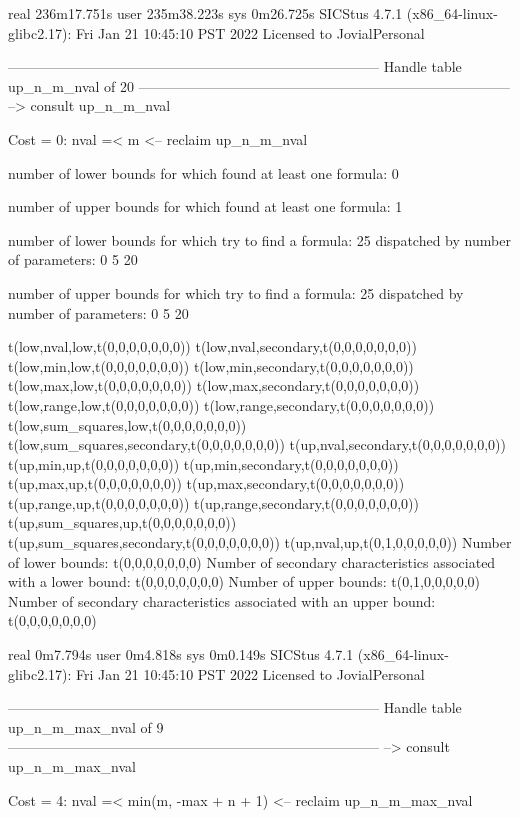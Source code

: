 real	236m17.751s
user	235m38.223s
sys	0m26.725s
SICStus 4.7.1 (x86_64-linux-glibc2.17): Fri Jan 21 10:45:10 PST 2022
Licensed to JovialPersonal


--------------------------------------------------------------------------------
Handle table up_n_m_nval of 20
--------------------------------------------------------------------------------
--> consult up_n_m_nval

Cost =  0:  nval =< m
<-- reclaim up_n_m_nval

number of lower bounds for which found at least one formula: 0

number of upper bounds for which found at least one formula: 1

number of lower bounds for which try to find a formula: 25
dispatched by number of parameters: 0  5  20

number of upper bounds for which try to find a formula: 25
dispatched by number of parameters: 0  5  20

t(low,nval,low,t(0,0,0,0,0,0,0))
t(low,nval,secondary,t(0,0,0,0,0,0,0))
t(low,min,low,t(0,0,0,0,0,0,0))
t(low,min,secondary,t(0,0,0,0,0,0,0))
t(low,max,low,t(0,0,0,0,0,0,0))
t(low,max,secondary,t(0,0,0,0,0,0,0))
t(low,range,low,t(0,0,0,0,0,0,0))
t(low,range,secondary,t(0,0,0,0,0,0,0))
t(low,sum_squares,low,t(0,0,0,0,0,0,0))
t(low,sum_squares,secondary,t(0,0,0,0,0,0,0))
t(up,nval,secondary,t(0,0,0,0,0,0,0))
t(up,min,up,t(0,0,0,0,0,0,0))
t(up,min,secondary,t(0,0,0,0,0,0,0))
t(up,max,up,t(0,0,0,0,0,0,0))
t(up,max,secondary,t(0,0,0,0,0,0,0))
t(up,range,up,t(0,0,0,0,0,0,0))
t(up,range,secondary,t(0,0,0,0,0,0,0))
t(up,sum_squares,up,t(0,0,0,0,0,0,0))
t(up,sum_squares,secondary,t(0,0,0,0,0,0,0))
t(up,nval,up,t(0,1,0,0,0,0,0))
Number of lower bounds:                                             t(0,0,0,0,0,0,0)
Number of secondary characteristics associated with a lower bound:  t(0,0,0,0,0,0,0)
Number of upper bounds:                                             t(0,1,0,0,0,0,0)
Number of secondary characteristics associated with an upper bound: t(0,0,0,0,0,0,0)

real	0m7.794s
user	0m4.818s
sys	0m0.149s
SICStus 4.7.1 (x86_64-linux-glibc2.17): Fri Jan 21 10:45:10 PST 2022
Licensed to JovialPersonal


--------------------------------------------------------------------------------
Handle table up_n_m_max_nval of 9
--------------------------------------------------------------------------------
--> consult up_n_m_max_nval

Cost =  4:  nval =< min(m, -max + n + 1) %
<-- reclaim up_n_m_max_nval

